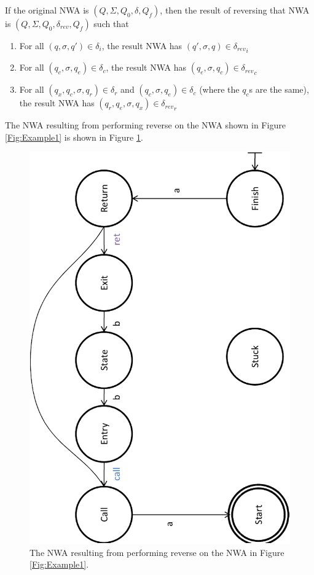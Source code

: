 If the original NWA is $(Q, \Sigma, Q_0, \delta, Q_f)$, then the result of
reversing that NWA is $(Q, \Sigma, Q_0, \delta_{rev}, Q_f)$ such that

\begin{enumerate}

\item For all $(q,\sigma,q') \in \delta_i$, the result NWA has $(q',\sigma,q)
  \in {\delta_{rev}}_i$

\item For all $(q_c,\sigma,q_e) \in \delta_c$, the result NWA has
  $(q_e,\sigma,q_c) \in {\delta_{rev}}_c$

\item For all $(q_x,q_c,\sigma,q_r) \in \delta_r$ and $(q_c,\sigma,q_e) \in
  \delta_c$ (where the $q_c$s are the same), the result NWA has
  $(q_r,q_e,\sigma,q_x) \in {\delta_{rev}}_r$

\end{enumerate}

\noindent The NWA resulting from performing reverse on the NWA shown in
Figure \ref{Fig:Example1} is shown in Figure \ref{Fig:Reverse1}.
 
\begin{figure}[p]
  \centering
    \includegraphics[width=12cm]{Figures/Figure15}
  \caption{The NWA resulting from performing reverse on the NWA in Figure \ref{Fig:Example1}.}
  \label{Fig:Reverse1}
\end{figure}

